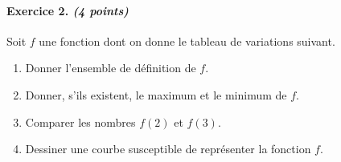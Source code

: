 \documentclass[11pt]{article}
\begin{document}
\paragraph{Exercice 2. \emph{(4 points)}} Soit $f$ une fonction dont on donne le tableau de
variations suivant.
\begin{center}
\end{center}
\begin{enumerate}[leftmargin=*]
  \item Donner l'ensemble de définition de $f$.
  \item Donner, s'ils existent, le maximum et le minimum de $f$.
  \item Comparer les nombres $f(2)$ et $f(3)$.
  \item Dessiner une courbe susceptible de représenter la fonction $f$.
\end{enumerate}


\newpage
\end{document}
